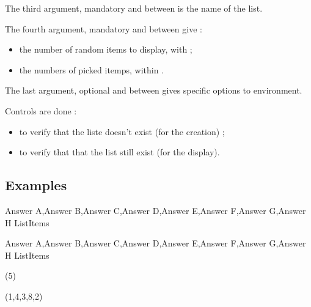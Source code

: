 \documentclass[english,11pt,a4paper]{article}
\begin{document}
The third argument, mandatory and between  is the name of the list.

The fourth argument, mandatory and between  give :

\begin{itemize}
	\item the number of random items to display, with  ;
	\item the numbers of picked itemps, within .
\end{itemize}


The last argument, optional and between  gives specific options to  environment.

\medskip

Controls are done :

\begin{itemize}
	\item to verify that the liste doesn't exist (for the creation) ;
	\item to verify that that the list still exist (for the display).
\end{itemize}

\subsection{Examples}

\begin{codehigh}[language=latex/latex3,style/main=teal!25,style/code=teal!25]
\CreateItemsList%
    {Answer A,Answer B,Answer C,Answer D,Answer E,Answer F,Answer G,Answer H}%
    {\mylistofitems}{ListItems}
\end{codehigh}

\CreateItemsList%
{Answer A,Answer B,Answer C,Answer D,Answer E,Answer F,Answer G,Answer H}%
{\mylistofitems}{ListItems}

\begin{demohigh}[language=latex/latex3,style/main=teal!25,style/code=teal!25]
(5)
\end{demohigh}

\begin{demohigh}[language=latex/latex3,style/main=teal!25,style/code=teal!25]
(1,4,3,8,2)
\end{demohigh}
\end{document}
